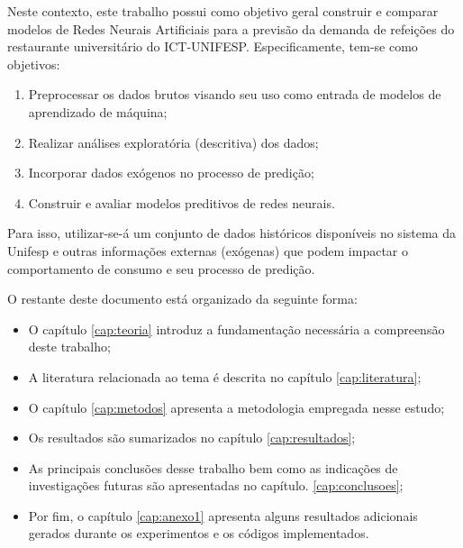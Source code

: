 Neste contexto, este trabalho possui como objetivo geral construir e comparar modelos de Redes Neurais Artificiais para a previsão da demanda de refeições do restaurante universitário do ICT-UNIFESP. Especificamente, tem-se como objetivos:  
\begin{enumerate}[label=\alph*)]
\item Preprocessar os dados brutos visando seu uso como entrada de modelos de aprendizado de máquina;
\item Realizar análises exploratória (descritiva) dos dados;
\item Incorporar dados exógenos no processo de predição;
\item Construir e avaliar modelos preditivos de redes neurais.
\end{enumerate}

Para isso, utilizar-se-á um conjunto de dados históricos disponíveis no sistema da Unifesp e outras informações externas (exógenas) que podem impactar o comportamento de consumo e seu processo de predição.

O restante deste documento está organizado da seguinte forma: 
\begin{itemize}
\item  O  capítulo \ref{cap:teoria} introduz a fundamentação necessária a compreensão deste trabalho;
\item A literatura relacionada ao tema é descrita no capítulo \ref{cap:literatura}; 
\item O capítulo \ref{cap:metodos} apresenta a metodologia empregada nesse estudo; 
\item Os resultados são sumarizados no capítulo \ref{cap:resultados};
\item As principais conclusões desse trabalho bem como as indicações de investigações futuras são apresentadas no capítulo. \ref{cap:conclusoes};
\item Por fim, o capítulo \ref{cap:anexo1} apresenta alguns resultados adicionais gerados durante os experimentos e os códigos implementados.
\end{itemize}
